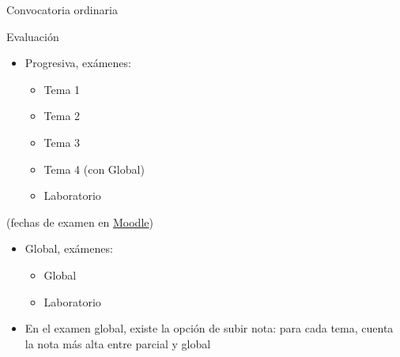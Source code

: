 \documentclass[aspectratio=169, usenames,svgnames,dvipsnames]{beamer}
\begin{document}
\begin{frame}{Convocatoria ordinaria}

    \vspace{-3mm}
    
    \begin{minipage}[t]{0.34\linewidth}
    \alert{Evaluación}
    \vspace{3mm}
    \begin{itemize}
    \item \alert{Progresiva}, exámenes:
        \begin{itemize}
            \normalsize
            \item Tema 1
            \item Tema 2
            \item Tema 3
            \item Tema 4 (con Global)
            \item Laboratorio
        \end{itemize}
    \end{itemize}
    (fechas de examen en \href{https://moodle.upm.es/titulaciones/oficiales/course/view.php?id=1218\#section-1}{Moodle})
    \begin{itemize}
    \item \alert{Global}, exámenes:
        \begin{itemize}
            \normalsize
            \item Global
            \item Laboratorio
        \end{itemize}
    \end{itemize}
    \end{minipage}
    \hfill%
    \begin{minipage}[t]{0.65\linewidth}
    \vspace{13.2mm}
        \begin{itemize}
        \vspace{36mm}
        
        \item En el examen global, existe la \alert{opción de subir nota}: para cada tema, cuenta la nota más alta entre parcial y global
        \end{itemize}    
    \end{minipage}

\end{frame}
\end{document}
